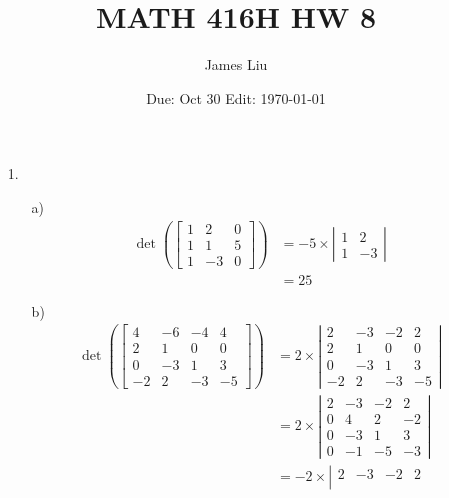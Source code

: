 \documentclass{article}
\date{Due: Oct 30 Edit: \today}
\title{MATH 416H HW 8}
\author{James Liu}
\begin{document}
\maketitle
\begin{itemize}
    \item [1.] 
    \begin{itemize}
        \item [a)]    \begin{align*}\det\left(
            \begin{bmatrix}
                1&2&0\\
                1&1&5\\
                1&-3&0
            \end{bmatrix}\right)&=
            -5\times \left|\begin{matrix}
                1&2\\
                1&-3
            \end{matrix}\right|\\
            &=25
        \end{align*}
        \item [b)] 
        \begin{align*}\det\left(
            \begin{bmatrix}
                4&-6&-4&4\\
                2&1&0&0\\
                0&-3&1&3\\
                -2&2&-3&-5
            \end{bmatrix}\right)&=2\times\left|\begin{matrix}
                2&-3&-2&2\\
                2&1&0&0\\
                0&-3&1&3\\
                -2&2&-3&-5
            \end{matrix}\right|
            \\
            &=2\times\left|\begin{matrix}
                2&-3&-2&2\\
                0&4&2&-2\\
                0&-3&1&3\\
                0&-1&-5&-3
            \end{matrix}\right|\\
            &=-2\times\left|\begin{matrix}
                2&-3&-2&2\\

\end{matrix}
\end{align*}
\end{itemize}
\end{itemize}
\end{document}
